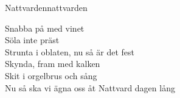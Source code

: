 \begin{song}{Nattvarden}{nattvarden}

\begin{vers}
Snabba på med vinet\\
Söla inte präst\\
Strunta i oblaten, nu så är det fest\\
Skynda, fram med kalken\\
Skit i orgelbrus och sång\\
Nu så ska vi ägna oss åt Nattvard dagen lång\\
\end{vers}
\end{song}
